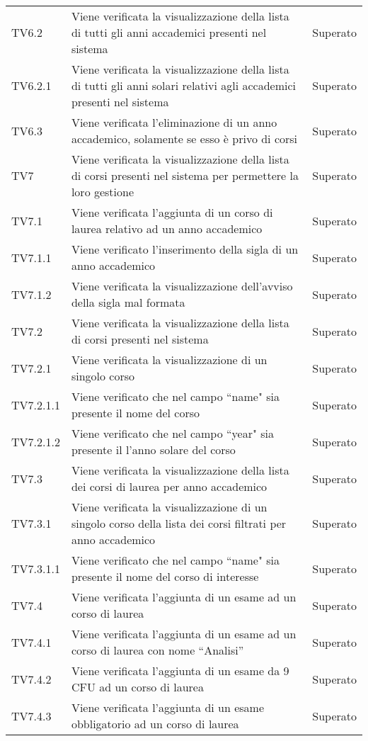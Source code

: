 \documentclass[PianoDiQualifica.tex]{subfiles}
\begin{document}
\begin{longtable}[H]{P{2cm}P{8.5cm}P{3cm}}
	TV6.2 & Viene verificata la visualizzazione della lista di tutti gli anni accademici presenti nel sistema & Superato \\ 
	TV6.2.1 & Viene verificata la visualizzazione della lista di tutti gli anni solari relativi agli accademici presenti nel sistema & Superato \\ 
	TV6.3 & Viene verificata l'eliminazione di un anno accademico, solamente se esso è privo di corsi & Superato \\ 
	TV7 & Viene verificata la visualizzazione della lista di corsi presenti nel sistema per permettere la loro gestione & Superato \\ 
	TV7.1 & Viene verificata l'aggiunta di un corso di laurea relativo ad un anno accademico & Superato \\ 
	TV7.1.1 & Viene verificato l'inserimento della sigla di un anno accademico & Superato \\ 
	TV7.1.2 & Viene verificata la visualizzazione dell'avviso della sigla mal formata & Superato \\ 
	TV7.2 & Viene verificata la visualizzazione della lista di corsi presenti nel sistema & Superato \\ 
	TV7.2.1 & Viene verificata la visualizzazione di un singolo corso & Superato \\ 
	TV7.2.1.1 & Viene verificato che nel campo ``name" sia presente il nome del corso & Superato \\ 
	TV7.2.1.2 & Viene verificato che nel campo ``year" sia presente il l'anno solare del corso & Superato \\ 
	TV7.3 & Viene verificata la visualizzazione della lista dei corsi di laurea per anno accademico & Superato \\ 
	TV7.3.1 & Viene verificata la visualizzazione di un singolo corso della lista dei corsi filtrati per anno accademico & Superato \\ 
	TV7.3.1.1 & Viene verificato che nel campo ``name" sia presente il nome del corso di interesse & Superato \\ 
	TV7.4 & Viene verificata l'aggiunta di un esame ad un corso di laurea & Superato \\ 
	TV7.4.1 & Viene verificata l'aggiunta di un esame ad un corso di laurea con nome “Analisi” & Superato \\ 
	TV7.4.2 & Viene verificata l'aggiunta di un esame da 9 CFU ad un corso di laurea & Superato \\ 
	TV7.4.3 & Viene verificata l'aggiunta di un esame obbligatorio ad un corso di laurea & Superato \\ 

\end{longtable}
\end{document}
